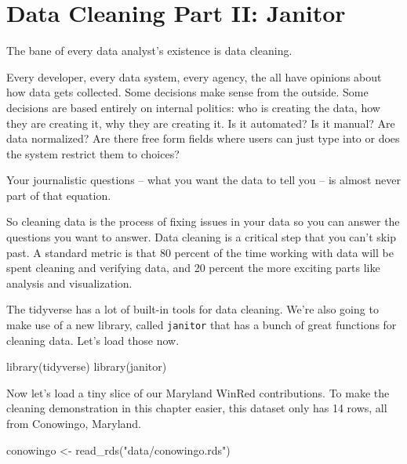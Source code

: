 \documentclass[
  letterpaper,
  DIV=11,
  numbers=noendperiod]{scrreprt}
\newenvironment{Shaded}{\begin{snugshade}}{\end{snugshade}}
\newcommand{\FunctionTok}[1]{\textcolor[rgb]{0.28,0.35,0.67}{#1}}
\newcommand{\NormalTok}[1]{\textcolor[rgb]{0.00,0.23,0.31}{#1}}
\newcommand{\OtherTok}[1]{\textcolor[rgb]{0.00,0.23,0.31}{#1}}
\newcommand{\StringTok}[1]{\textcolor[rgb]{0.13,0.47,0.30}{#1}}
\begin{document}

\hypertarget{data-cleaning-part-ii-janitor}{%
\chapter{Data Cleaning Part II:
Janitor}\label{data-cleaning-part-ii-janitor}}

The bane of every data analyst's existence is data cleaning.

Every developer, every data system, every agency, the all have opinions
about how data gets collected. Some decisions make sense from the
outside. Some decisions are based entirely on internal politics: who is
creating the data, how they are creating it, why they are creating it.
Is it automated? Is it manual? Are data normalized? Are there free form
fields where users can just type into or does the system restrict them
to choices?

Your journalistic questions -- what you want the data to tell you -- is
almost never part of that equation.

So cleaning data is the process of fixing issues in your data so you can
answer the questions you want to answer. Data cleaning is a critical
step that you can't skip past. A standard metric is that 80 percent of
the time working with data will be spent cleaning and verifying data,
and 20 percent the more exciting parts like analysis and visualization.

The tidyverse has a lot of built-in tools for data cleaning. We're also
going to make use of a new library, called \texttt{janitor} that has a
bunch of great functions for cleaning data. Let's load those now.

\begin{Shaded}
\begin{Highlighting}[]
\FunctionTok{library}\NormalTok{(tidyverse)}
\FunctionTok{library}\NormalTok{(janitor)}
\end{Highlighting}
\end{Shaded}

Now let's load a tiny slice of our Maryland WinRed contributions. To
make the cleaning demonstration in this chapter easier, this dataset
only has 14 rows, all from Conowingo, Maryland.

\begin{Shaded}
\begin{Highlighting}[]
\NormalTok{conowingo }\OtherTok{\textless{}{-}} \FunctionTok{read\_rds}\NormalTok{(}\StringTok{"data/conowingo.rds"}\NormalTok{)}
\end{Highlighting}
\end{Shaded}
\end{document}
